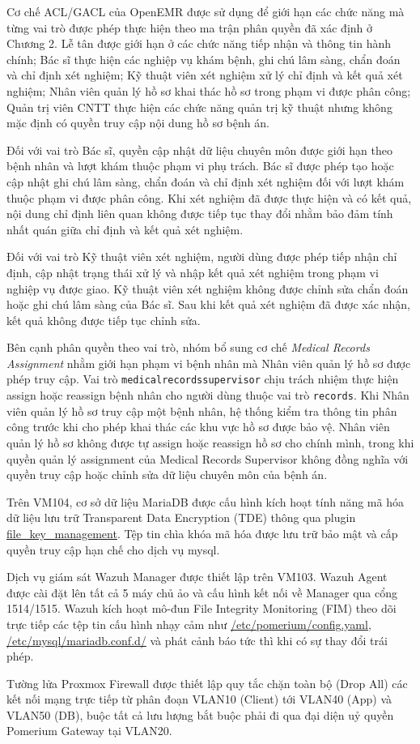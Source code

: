 Cơ chế ACL/GACL của OpenEMR được sử dụng để giới hạn các chức năng mà từng vai trò được phép thực hiện theo ma trận phân quyền đã xác định ở Chương 2. Lễ tân được giới hạn ở các chức năng tiếp nhận và thông tin hành chính; Bác sĩ thực hiện các nghiệp vụ khám bệnh, ghi chú lâm sàng, chẩn đoán và chỉ định xét nghiệm; Kỹ thuật viên xét nghiệm xử lý chỉ định và kết quả xét nghiệm; Nhân viên quản lý hồ sơ khai thác hồ sơ trong phạm vi được phân công; Quản trị viên CNTT thực hiện các chức năng quản trị kỹ thuật nhưng không mặc định có quyền truy cập nội dung hồ sơ bệnh án.

Đối với vai trò Bác sĩ, quyền cập nhật dữ liệu chuyên môn được giới hạn theo bệnh nhân và lượt khám thuộc phạm vi phụ trách. Bác sĩ được phép tạo hoặc cập nhật ghi chú lâm sàng, chẩn đoán và chỉ định xét nghiệm đối với lượt khám thuộc phạm vi được phân công. Khi xét nghiệm đã được thực hiện và có kết quả, nội dung chỉ định liên quan không được tiếp tục thay đổi nhằm bảo đảm tính nhất quán giữa chỉ định và kết quả xét nghiệm.

Đối với vai trò Kỹ thuật viên xét nghiệm, người dùng được phép tiếp nhận chỉ định, cập nhật trạng thái xử lý và nhập kết quả xét nghiệm trong phạm vi nghiệp vụ được giao. Kỹ thuật viên xét nghiệm không được chỉnh sửa chẩn đoán hoặc ghi chú lâm sàng của Bác sĩ. Sau khi kết quả xét nghiệm đã được xác nhận, kết quả không được tiếp tục chỉnh sửa.

Bên cạnh phân quyền theo vai trò, nhóm bổ sung cơ chế \textit{Medical Records Assignment} nhằm giới hạn phạm vi bệnh nhân mà Nhân viên quản lý hồ sơ được phép truy cập. Vai trò \texttt{medicalrecordssupervisor} chịu trách nhiệm thực hiện assign hoặc reassign bệnh nhân cho người dùng thuộc vai trò \texttt{records}. Khi Nhân viên quản lý hồ sơ truy cập một bệnh nhân, hệ thống kiểm tra thông tin phân công trước khi cho phép khai thác các khu vực hồ sơ được bảo vệ. Nhân viên quản lý hồ sơ không được tự assign hoặc reassign hồ sơ cho chính mình, trong khi quyền quản lý assignment của Medical Records Supervisor không đồng nghĩa với quyền truy cập hoặc chỉnh sửa dữ liệu chuyên môn của bệnh án.

Trên VM104, cơ sở dữ liệu MariaDB được cấu hình kích hoạt tính năng mã hóa dữ liệu lưu trữ Transparent Data Encryption (TDE) thông qua plugin \url{file_key_management}. Tệp tin chìa khóa mã hóa được lưu trữ bảo mật và cấp quyền truy cập hạn chế cho dịch vụ mysql.

Dịch vụ giám sát Wazuh Manager được thiết lập trên VM103. Wazuh Agent được cài đặt lên tất cả 5 máy chủ ảo và cấu hình kết nối về Manager qua cổng 1514/1515. Wazuh kích hoạt mô-đun File Integrity Monitoring (FIM) theo dõi trực tiếp các tệp tin cấu hình nhạy cảm như \url{/etc/pomerium/config.yaml}, \url{/etc/mysql/mariadb.conf.d/} và phát cảnh báo tức thì khi có sự thay đổi trái phép.

Tường lửa Proxmox Firewall được thiết lập quy tắc chặn toàn bộ (Drop All) các kết nối mạng trực tiếp từ phân đoạn VLAN10 (Client) tới VLAN40 (App) và VLAN50 (DB), buộc tất cả lưu lượng bắt buộc phải đi qua đại diện uỷ quyền Pomerium Gateway tại VLAN20.
